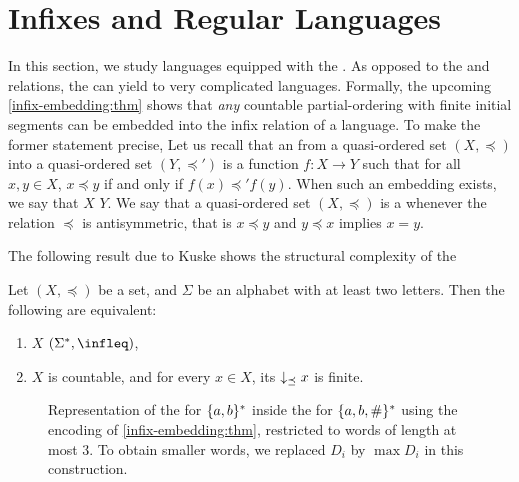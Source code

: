 \section{Infixes and Regular Languages}
\label{infixes-regular:sec}


\AP
In this section, we study languages equipped with the . As
opposed to the  and  relations, the 
can yield to very complicated  languages. Formally, the
upcoming \cref{infix-embedding:thm} shows that \emph{any} countable
partial-ordering with finite initial segments can be embedded into the infix
relation of a language. To make the former statement precise,
Let us recall that an  from a quasi-ordered set $(X,
\preceq)$ into a quasi-ordered set $(Y, \preceq')$ is a function $f \colon X
\to Y$ such that for all $x, y \in X$, $x \preceq y$ if and only if $f(x)
\preceq' f(y)$. When such an embedding exists, we say that $X$  $Y$. We say that a quasi-ordered set $(X, \preceq)$ is a  whenever the relation $\preceq$ is antisymmetric, that is $x \preceq
y$ and $y \preceq x$ implies $x = y$. 

The following result due to Kuske shows the structural complexity of the 

\begin{lemma}{\cite[Lemma 5.1]{DBLP:journals/ita/Kuske06}}
    \label{infix-embedding:thm}
    Let $(X, \preceq)$ be a  set,
    and $\Sigma$ be an alphabet with at least two letters.
    Then the following are equivalent:
    \begin{enumerate}
        \item \label{infix-embedding-embeds:item} 
            $X$  $(\Sigma^*, \infleq)$,
        \item \label{infix-embedding-count:item}
            $X$ is countable, and for every $x \in X$,
            its 
            $\dwset[\preceq]{x}$ is finite.
    \end{enumerate}
\end{lemma}
\begin{figure}
    \centering
    
    \caption{Representation of the  for $\{ a,b \}^*$
        inside the  for $\{ a,b,\# \}^*$
        using the encoding of \cref{infix-embedding:thm}, restricted to words
        of length at most $3$. To obtain smaller words,
        we replaced $D_i$ by $\max D_i$ in this construction.
    }
    \label{infix-embedding:fig}
\end{figure}

